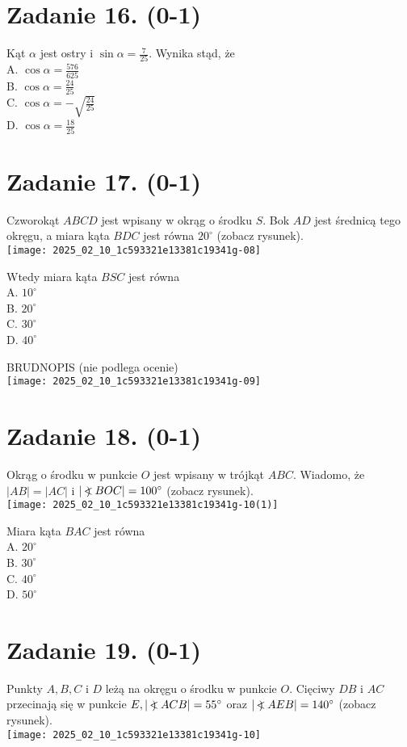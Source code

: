 \documentclass[10pt]{article}
\newcommand\Varangle{\mathop{{<\!\!\!\!\!\text{\small)}}\:}\nolimits}
\begin{document}
\section*{Zadanie 16. (0-1)}
Kąt \(\alpha\) jest ostry i \(\sin \alpha=\frac{7}{25}\). Wynika stąd, że\\
A. \(\cos \alpha=\frac{576}{625}\)\\
B. \(\cos \alpha=\frac{24}{25}\)\\
C. \(\cos \alpha=-\sqrt{\frac{24}{25}}\)\\
D. \(\cos \alpha=\frac{18}{25}\)

\section*{Zadanie 17. (0-1)}
Czworokąt \(A B C D\) jest wpisany w okrąg o środku \(S\). Bok \(A D\) jest średnicą tego okręgu, a miara kąta \(B D C\) jest równa \(20^{\circ}\) (zobacz rysunek).\\
\texttt{[image: 2025\_02\_10\_1c593321e13381c19341g-08]}

Wtedy miara kąta \(B S C\) jest równa\\
A. \(10^{\circ}\)\\
B. \(20^{\circ}\)\\
C. \(30^{\circ}\)\\
D. \(40^{\circ}\)

BRUDNOPIS (nie podlega ocenie)\\
\texttt{[image: 2025\_02\_10\_1c593321e13381c19341g-09]}

\section*{Zadanie 18. (0-1)}
Okrąg o środku w punkcie \(O\) jest wpisany w trójkąt \(A B C\). Wiadomo, że \(|A B|=|A C|\) i \(|\Varangle B O C|=100^{\circ}\) (zobacz rysunek).\\
\texttt{[image: 2025\_02\_10\_1c593321e13381c19341g-10(1)]}

Miara kąta \(B A C\) jest równa\\
A. \(20^{\circ}\)\\
B. \(30^{\circ}\)\\
C. \(40^{\circ}\)\\
D. \(50^{\circ}\)

\section*{Zadanie 19. (0-1)}
Punkty \(A, B, C\) i \(D\) leżą na okręgu o środku w punkcie \(O\). Cięciwy \(D B\) i \(A C\) przecinają się w punkcie \(E,|\Varangle A C B|=55^{\circ}\) oraz \(|\Varangle A E B|=140^{\circ}\) (zobacz rysunek).\\
\texttt{[image: 2025\_02\_10\_1c593321e13381c19341g-10]}
\end{document}
